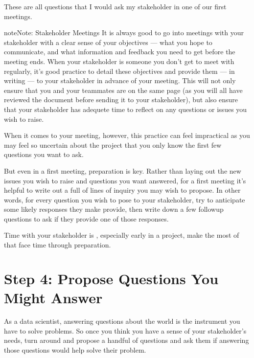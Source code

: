 \documentclass[letterpaper,10pt,english]{jupyterBook}
\begin{document}
\sphinxAtStartPar
These are all questions that I would ask my stakeholder in one of our first meetings.

\begin{sphinxadmonition}{note}{Note:}
\sphinxAtStartPar
Stakeholder Meetings
It is always good to go into meetings with your stakeholder with a clear sense of your objectives — what you hope to communicate, and what information and feedback you need to get before the meeting ends. When your stakeholder is someone you don’t get to meet with regularly, it’s good practice to detail these objectives and provide them — in writing — to your stakeholder in advance of your meeting. This will not only ensure that you and your teammates are on the same page (as you will all have reviewed the document before sending it to your stakeholder), but also ensure that your stakeholder has adequete time to reflect on any questions or issues you wish to raise.

\sphinxAtStartPar
When it comes to your  meeting, however, this practice can feel impractical as you may feel so uncertain about the project that you only know the first few questions you want to ask.

\sphinxAtStartPar
But even in a first meeting, preparation is key. Rather than laying out the new issues you wish to raise and questions you want answered, for a first meeting it’s helpful to write out a full  of lines of inquiry you may wish to propose. In other words, for every question you wish to pose to your stakeholder, try to anticipate some likely responses they make provide, then write down a few followup questions to ask if they provide one of those responses.

\sphinxAtStartPar
Time with your stakeholder is , especially early in a project, make the most of that face time through preparation.
\end{sphinxadmonition}


\section{Step 4: Propose Questions You Might Answer}
\label{\detokenize{20_problems_to_questions/20_stakeholder_management:step-4-propose-questions-you-might-answer}}
\sphinxAtStartPar
As a data scientist, answering questions about the world is the instrument you have to solve problems. So once you think you have a sense of your stakeholder’s needs, turn around and propose a handful of questions and ask them if answering those questions would help solve their problem.
\end{document}
